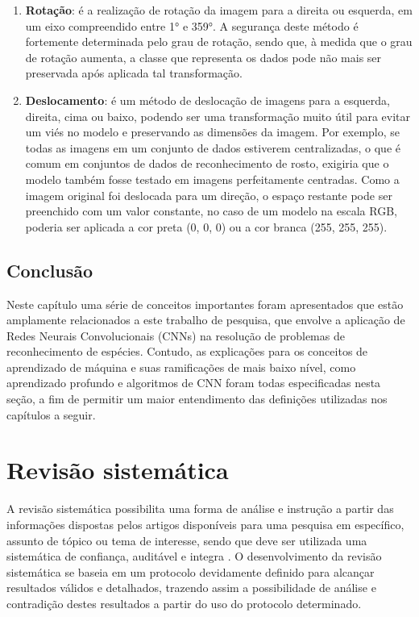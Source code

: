 \documentclass[
	12pt,				%
	oneside,			%
	a4paper,			%
	english,			%
	brazil				%
	]{abntex2ppgsi}
\begin{document}
\begin{enumerate}
  \item \textbf{Rotação}: é a realização de rotação da imagem para a direita ou esquerda, em um eixo compreendido entre 1° e 359°. A segurança deste método é fortemente determinada pelo grau de rotação, sendo que, à medida que o grau de rotação aumenta, a classe que representa os dados pode não mais ser preservada após aplicada tal transformação.
  
  \item \textbf{Deslocamento}: é um método de deslocação de imagens para a esquerda, direita, cima ou baixo, podendo ser uma transformação muito útil para evitar um viés no modelo e preservando as dimensões da imagem. Por exemplo, se todas as imagens em um conjunto de dados estiverem centralizadas, o que é comum em conjuntos de dados de reconhecimento de rosto, exigiria que o modelo também fosse testado em imagens perfeitamente centradas. Como a imagem original foi deslocada para um direção, o espaço restante pode ser preenchido com um valor constante, no caso de um modelo na escala RGB, poderia ser aplicada a cor preta (0, 0, 0) ou a cor branca (255, 255, 255).
\end{enumerate}

\section{Conclusão}
Neste capítulo uma série de conceitos importantes foram apresentados que estão amplamente relacionados a este trabalho de pesquisa, que envolve a aplicação de Redes Neurais Convolucionais (CNNs) na resolução de problemas de reconhecimento de espécies. Contudo, as explicações para os conceitos de aprendizado de máquina e suas ramificações de mais baixo nível, como aprendizado profundo e algoritmos de CNN foram todas especificadas nesta seção, a fim de permitir um maior entendimento das definições utilizadas nos capítulos a seguir.

\chapter{Revisão sistemática}
A revisão sistemática possibilita uma forma de análise e instrução a partir das informações dispostas pelos artigos disponíveis para uma pesquisa em específico, assunto de tópico ou tema de interesse, sendo que deve ser utilizada uma sistemática de confiança, auditável e integra \cite{garcia2020guidelines}.
O desenvolvimento da revisão sistemática se baseia em um protocolo devidamente definido para alcançar resultados válidos e detalhados, trazendo assim a possibilidade de análise e contradição destes resultados a partir do uso do protocolo determinado.
\end{document}
